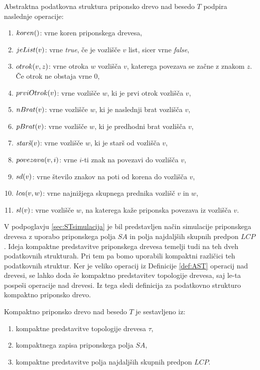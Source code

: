 \begin{defi}\label{def:AST}
    Abstraktna podatkovna struktura priponsko drevo nad besedo $T$ podpira naslednje operacije:
    \newpage
    \begin{enumerate}
        \item $\Koren$: vrne koren priponskega drevesa,
        \item $\List{v}$: vrne \textit{true}, če je vozlišče $v$ list, sicer vrne \textit{false},
        \item $\Otrok{v}{z}$: vrne otroka $w$ vozlišča $v$, katerega povezava se začne z znakom $z$. Če otrok ne obstaja vrne 0,
        \item $\PrviOtrok{v}$: vrne vozlišče $w$, ki je prvi otrok vozlišča $v$,
        \item $\NBrat{v}$: vrne vozlišče $w$, ki je naslednji brat vozlišča $v$,
        \item $\PBrat{v}$: vrne vozlišče $w$, ki je predhodni brat vozlišča $v$,
        \item $\Stars{v}$: vrne vozlišče $w$, ki je starš od vozlišča $v$,
        \item $\Povezava{v}{i}$: vrne $i$-ti znak na povezavi do vozlišča $v$,
        \item $\Sd{v}$: vrne število znakov na poti od korena do vozlišča $v$,
        \item $\Lca{v}{w}$: vrne najnižjega skupnega prednika vozlišč $v$ in $w$,
        \item $\Sl{v}$: vrne vozlišče $w$, na katerega kaže priponska povezava iz vozlišča $v$.
    \end{enumerate}
\end{defi}

V podpoglavju \ref{sec:STsimulacija} je bil predstavljen način simulacije priponskega drevesa z uporabo priponskega polja $SA$ in polja najdaljših skupnih predpon $LCP$. Ideja kompaktne predstavitve priponskega drevesa temelji tudi na teh dveh podatkovnih strukturah. Pri tem pa bomo uporabili kompaktni različici teh podatkovnih struktur. Ker je veliko operacij iz Definicije \ref{def:AST} operacij nad drevesi, se lahko doda še kompaktno predstavitev topologije drevesa, saj le-ta pospeši operacije nad drevesi. Iz tega sledi definicija za podatkovno strukturo kompaktno priponsko drevo.

\begin{defi}
    Kompaktno priponsko drevo nad besedo $T$ je sestavljeno iz:
    \begin{enumerate}
        \item kompaktne predstavitve topologije drevesa $\tau$,
        \item kompaktnega zapisa priponskega polja $SA$, %
        \item kompaktne predstavitve polja najdaljših skupnih predpon $LCP$.
    \end{enumerate}
\end{defi}

